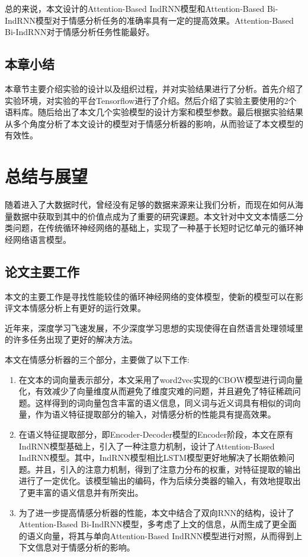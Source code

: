 \documentclass[a4paper,AutoFakeBold,oneside,12pt]{book}
\begin{document}
总的来说，本文设计的Attention-Based IndRNN模型和Attention-Based Bi-IndRNN模型对于情感分析任务的准确率具有一定的提高效果。Attention-Based Bi-IndRNN对于情感分析任务性能最好。

\section{本章小结}
本章节主要介绍实验的设计以及组织过程，并对实验结果进行了分析。首先介绍了实验环境，对实验的平台Tensorflow进行了介绍。然后介绍了实验主要使用的2个语料库。随后给出了本文几个实验模型的设计方案和模型参数。最后根据实验结果从多个角度分析了本文设计的模型对于情感分析器的影响，从而验证了本文模型的有效性。


\chapter{总结与展望}
随着进入了大数据时代，曾经没有足够的数据来源来让我们分析，而现在如何从海量数据中获取到其中的价值点成为了重要的研究课题。本文针对中文文本情感二分类问题，在传统循环神经网络的基础上，实现了一种基于长短时记忆单元的循环神经网络语言模型。

\section{论文主要工作}

本文的主要工作是寻找性能较佳的循环神经网络的变体模型，使新的模型可以在影评文本情感分析上有更好的运行效果。

近年来，深度学习飞速发展，不少深度学习思想的实现使得在自然语言处理领域里的许多任务出现了更好的解决方法。

本文在情感分析器的三个部分，主要做了以下工作:

\begin{enumerate}
    \item 在文本的词向量表示部分，本文采用了word2vec实现的CBOW模型进行词向量化，有效减少了向量维度从而避免了维度灾难的问题，并且避免了特征稀疏问题。这样得到的词向量包含丰富的语义信息，同义词与近义词具有相似的词向量，作为语义特征提取部分的输入，对情感分析的性能具有提高效果。
    \item 在语义特征提取部分，即Encoder-Decoder模型的Encoder阶段，本文在原有IndRNN模型基础上，引入了一种注意力机制，设计了Attention-Based IndRNN模型。其中，IndRNN模型相比LSTM模型更好地解决了长期依赖问题。并且，引入的注意力机制，得到了注意力分布的权重，对特征提取的输出进行了一定优化。该模型输出的编码，作为后续分类器的输入，有效地提取出了更丰富的语义信息并有所突出。
    \item 为了进一步提高情感分析器的性能，本文中结合了双向RNN的结构，设计了Attention-Based Bi-IndRNN模型，多考虑了上文的信息，从而生成了更全面的语义向量，将其与单向Attention-Based IndRNN模型进行对照，从而得到上下文信息对于情感分析的影响。
\end{enumerate}
\end{document}
